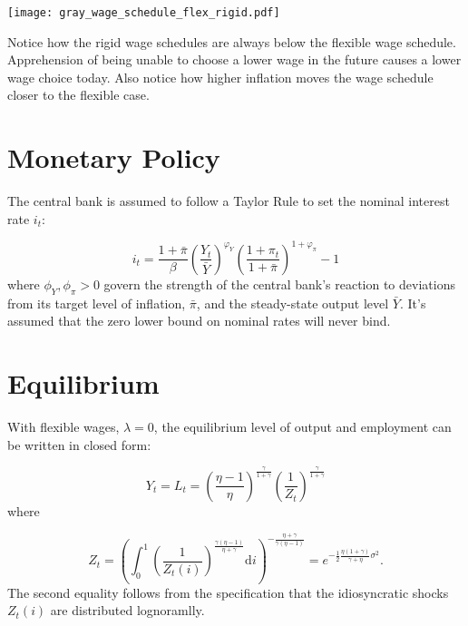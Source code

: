 \documentclass[12pt,a4paper]{scrartcl}            %
\begin{document}
\begin{center}
  \noindent \texttt{[image: gray\_wage\_schedule\_flex\_rigid.pdf]}
  \label{fig:wage_schedules}
\end{center}
%
Notice how the rigid wage schedules are always below the flexible wage schedule.
Apprehension of being unable to choose a lower wage in the future causes a lower wage choice today.
Also notice how higher inflation moves the wage schedule closer to the flexible case.


\section{Monetary Policy}
\label{sec:monetary_policy}

The central bank is assumed to follow a Taylor Rule to set the nominal interest rate $i_t$:

\begin{equation}
    \label{eq:taylor_rule}
    i_t = \frac{1 + \bar{\pi}}{\beta} \left( \frac{Y_t}{\bar{Y}} \right)^{\varphi_Y} \left( \frac{1 + \pi_t}{1 + \bar{\pi}} \right)^{1 + \varphi_{\pi}} - 1
\end{equation}
%
where $\phi_Y, \phi_{\pi} > 0$ govern the strength of the central bank's reaction to deviations from its target level of inflation, $\bar{\pi}$, and the steady-state output level $\bar{Y}$.
It's assumed that the zero lower bound on nominal rates will never bind.

\section{Equilibrium}
\label{sec:equilibrium}

With flexible wages, $\lambda = 0$, the equilibrium level of output and employment can be written in closed form:

\begin{equation}
    \label{eq:output_flexible}
    Y_t = L_t = \left( \frac{\eta - 1}{\eta} \right)^{\frac{\gamma}{1 + \gamma}} \left( \frac{1}{Z_t} \right)^{\frac{\gamma}{1 + \gamma}}
\end{equation}
%
where

\begin{equation}
    Z_t = \left( \int_{0}^{1}\! \left( \frac{1}{Z_t(i)} \right)^{\frac{\gamma(\eta - 1)}{\eta + \gamma}} \mathrm{d}i \right)^{-\frac{\eta + \gamma}{\gamma(\eta - 1)}} \!\!\! = e^{-\frac{1}{2} \frac{\eta(1 + \gamma)}{\gamma + \eta}\sigma^2 }.
\end{equation}
%
The second equality follows from the specification that the idiosyncratic shocks $Z_t(i)$ are distributed lognoramlly.
\end{document}

